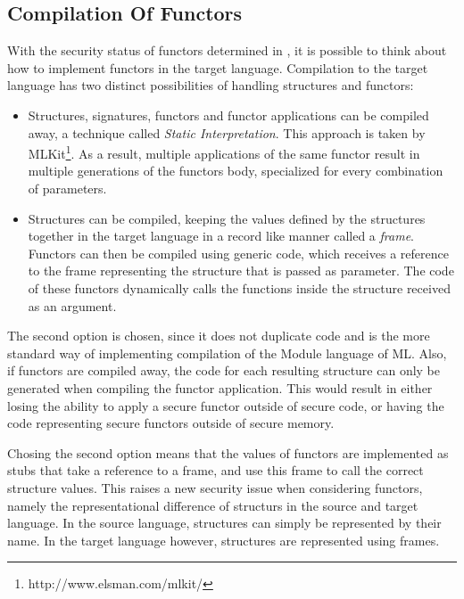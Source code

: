 \documentclass[10pt,a4paper,master=cws, masteroption=ai,english,inputenc=utf8]{kulemt}
\begin{document}
\subsection{Compilation Of Functors\label{sec:FunctorCompilation}}
With the security status of functors determined in , it is possible to think about how to implement functors in the target language.
Compilation to the target language has two distinct possibilities of handling structures and functors:
\begin{itemize}
    \item Structures, signatures, functors and functor applications can be compiled away, a technique called \emph{Static Interpretation}.\cite{Elsman}
    This approach is taken by MLKit\footnote{http://www.elsman.com/mlkit/}.
    As a result, multiple applications of the same functor result in multiple generations of the functors body, specialized for every combination of parameters.
    \item Structures can be compiled, keeping the values defined by the structures together in the target language in a record like manner called a \emph{frame}.
    Functors can then be compiled using generic code, which receives a reference to the frame representing the structure that is passed as parameter.
    The code of these functors dynamically calls the functions inside the structure received as an argument.
\end{itemize}

The second option is chosen, since it does not duplicate code and is the more standard way of implementing compilation of the Module language of ML.
Also, if functors are compiled away, the code for each resulting structure can only be generated when compiling the functor application.
This would result in either losing the ability to apply a secure functor outside of secure code, or having the code representing secure functors outside of secure memory.

Chosing the second option means that the values of functors are implemented as stubs that take a reference to a frame, and use this frame to call the correct structure values.
This raises a new security issue when considering functors, namely the representational difference of structurs in the source and target language.
In the source language, structures can simply be represented by their name.
In the target language however, structures are represented using frames.
\end{document}
